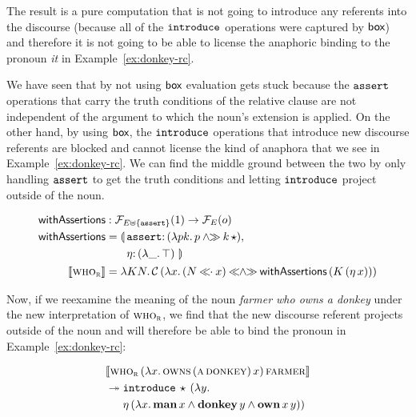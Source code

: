 The result is a pure computation that is not going to introduce any
referents into the discourse (because all of the $\mathtt{introduce}$
operations were captured by $\textsf{box}$) and therefore it is not going to be
able to license the anaphoric binding to the pronoun \emph{it} in
Example~\ref{ex:donkey-rc}.

We have seen that by not using $\textsf{box}$ evaluation gets stuck because the
$\mathtt{assert}$ operations that carry the truth conditions of the relative
clause are not independent of the argument to which the noun's extension is
applied. On the other hand, by using $\textsf{box}$, the $\mathtt{introduce}$
operations that introduce new discourse referents are blocked and cannot
license the kind of anaphora that we see in Example~\ref{ex:donkey-rc}. We
can find the middle ground between the two by only handling $\mathtt{assert}$
to get the truth conditions and letting $\mathtt{introduce}$ project outside of
the noun.

\begin{align*}
  \withAssertions &: \FF_{E \uplus \{\op{assert}\}}(1) \to \FF_E(o) \\
  \withAssertions &= \lban \begin{aligned}[t]
      &\onto{\op{assert}}{(\lam{p k}{p \andr \ap{k}{\star}})}, \\
      &\onto{\eta}{(\lam{\_}{\top})} \, \rban
    \end{aligned} \\
  \sem{\abs{who}_{\abs{r}}} &= \lam{K N}{\ap{\CC}{(\lam{x}{(N \apl x) \andlr \ap{\withAssertions}{(\ap{K}{(\etaE{x})})}})}}
\end{align*}

Now, if we reexamine the meaning of the noun \emph{farmer who owns a
  donkey} under the new interpretation of $\textsc{who}_{\textsc{r}}$, we find
that the new discourse referent projects outside of the noun and will
therefore be able to bind the pronoun in Example~\ref{ex:donkey-rc}:

\begin{align*}
& \llbracket \textsc{who}_{\textsc{r}}\,(\lambda x.\, \textsc{owns}\,(\textsc{a}\,\textsc{donkey})\,x)\,\textsc{farmer} \rrbracket \\
& \twoheadrightarrow \begin{aligned}[t]
    &\mathtt{introduce}\,\star\,(\lambda y.\,  \\
    &\eta\,(\lambda x.\, \textbf{man}\,x \land \textbf{donkey}\,y \land \textbf{own}\,x\,y))\end{aligned}
\end{align*}

